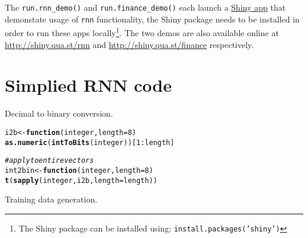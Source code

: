 \documentclass[english,article]{article}\usepackage[]{graphicx}\usepackage[]{color}
\makeatletter
\newcommand{\hlnum}[1]{\textcolor[rgb]{0.686,0.059,0.569}{#1}}%
\newcommand{\hlcom}[1]{\textcolor[rgb]{0.678,0.584,0.686}{\textit{#1}}}%
\newcommand{\hlopt}[1]{\textcolor[rgb]{0,0,0}{#1}}%
\newcommand{\hlstd}[1]{\textcolor[rgb]{0.345,0.345,0.345}{#1}}%
\newcommand{\hlkwa}[1]{\textcolor[rgb]{0.161,0.373,0.58}{\textbf{#1}}}%
\newcommand{\hlkwb}[1]{\textcolor[rgb]{0.69,0.353,0.396}{#1}}%
\newcommand{\hlkwc}[1]{\textcolor[rgb]{0.333,0.667,0.333}{#1}}%
\newcommand{\hlkwd}[1]{\textcolor[rgb]{0.737,0.353,0.396}{\textbf{#1}}}%
\newenvironment{kframe}{%
 \def\at@end@of@kframe{}%
 \ifinner\ifhmode%
  \def\at@end@of@kframe{\end{minipage}}%
  \begin{minipage}{\columnwidth}%
 \fi\fi%
 \def\FrameCommand##1{\hskip\@totalleftmargin \hskip-\fboxsep
 \colorbox{shadecolor}{##1}\hskip-\fboxsep
     \hskip-\linewidth \hskip-\@totalleftmargin \hskip\columnwidth}%
 \MakeFramed {\advance\hsize-\width
   \@totalleftmargin\z@ \linewidth\hsize
   \@setminipage}}%
 {\par\unskip\endMakeFramed%
 \at@end@of@kframe}
\newenvironment{knitrout}{}{} %
\providecommand*{\code}[1]{\texttt{#1}}
\makeatother
\begin{document}
The \code{run.rnn\_demo()} and \code{run.finance\_demo()} each launch
a \href{http://shiny.rstudio.com/}{Shiny app} that demonstate usage
of \code{rnn} functionality, the Shiny package needs to be installed
in order to run these apps locally\footnote{The Shiny package can be installed using: \code{install.packages('shiny')}}.
The two demos are also available online at \href{http://shiny.qua.st/rnn}{http://shiny.qua.st/rnn}
and \href{http://shiny.qua.st/finance}{http://shiny.qua.st/finance}
respectively.

\nocite{hebb2005organization}
\nocite{linnainmaa1970representation}
\nocite{mcculloch1943logical}
\nocite{minsky1952neural}
\nocite{rosenblatt1958perceptron}
\nocite{rumelhart1986learning}
\nocite{werbos1974beyond}
\nocite{werbos1988generalization}
\nocite{widrow1960adaptive}




\appendix

\section{Simplied RNN code}

\label{sec:Simplied-RNN-code}

Decimal to binary conversion.

\begin{knitrout}
\color{fgcolor}\begin{kframe}
\begin{alltt}
\hlstd{i2b} \hlkwb{<-} \hlkwa{function}\hlstd{(}\hlkwc{integer}\hlstd{,} \hlkwc{length}\hlstd{=}\hlnum{8}\hlstd{)}
  \hlkwd{as.numeric}\hlstd{(}\hlkwd{intToBits}\hlstd{(integer))[}\hlnum{1}\hlopt{:}\hlstd{length]}

\hlcom{# apply to entire vectors}
\hlstd{int2bin} \hlkwb{<-} \hlkwa{function}\hlstd{(}\hlkwc{integer}\hlstd{,} \hlkwc{length}\hlstd{=}\hlnum{8}\hlstd{)}
  \hlkwd{t}\hlstd{(}\hlkwd{sapply}\hlstd{(integer, i2b,} \hlkwc{length}\hlstd{=length))}
\end{alltt}
\end{kframe}
\end{knitrout}

Training data generation.
\end{document}
